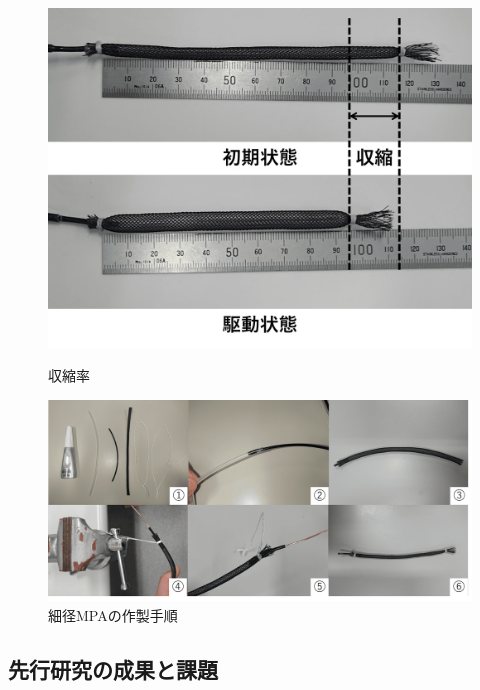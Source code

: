 \begin{figure}[t]
  \begin{minipage}{1\columnwidth}
    \centering
    \includegraphics[scale=0.1]{image/syusyuku.png}
    \vspace{-3mm}
    \caption{収縮率}
    \label{fig:syusyuku}
  \end{minipage}
  \begin{minipage}{1\columnwidth}
    \centering
    \vspace{3mm}
    \includegraphics[scale=0.3]{image/method.png}
    \caption{細径MPAの作製手順}
    \label{fig:method}
  \end{minipage}
\end{figure}
%
\subsection{先行研究の成果と課題}



